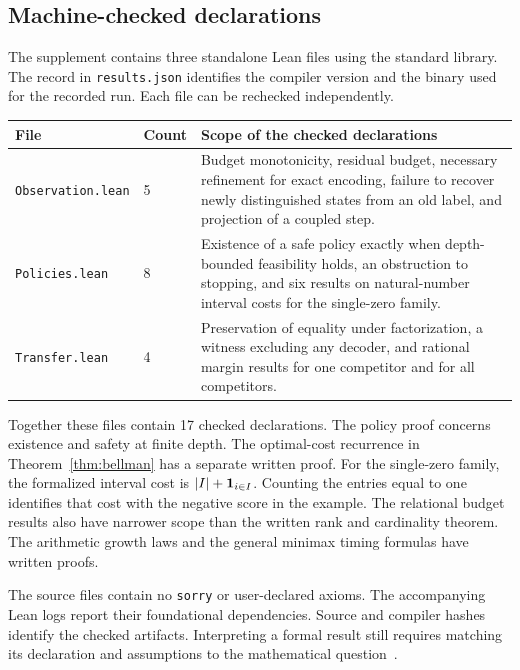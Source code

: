 \subsection{Machine-checked declarations}
The supplement contains three standalone Lean files using the standard library. The record in \texttt{results.json} identifies the compiler version and the binary used for the recorded run. Each file can be rechecked independently.
\begin{longtable}{p{}p{}p{}}
\toprule File & Count & Scope of the checked declarations\\\midrule\endhead
\texttt{Observation.lean} & 5 & Budget monotonicity, residual budget, necessary refinement for exact encoding, failure to recover newly distinguished states from an old label, and projection of a coupled step.\\
\texttt{Policies.lean} & 8 & Existence of a safe policy exactly when depth-bounded feasibility holds, an obstruction to stopping, and six results on natural-number interval costs for the single-zero family.\\
\texttt{Transfer.lean} & 4 & Preservation of equality under factorization, a witness excluding any decoder, and rational margin results for one competitor and for all competitors.\\
\bottomrule
\end{longtable}
Together these files contain 17 checked declarations. The policy proof concerns existence and safety at finite depth. The optimal-cost recurrence in Theorem~\ref{thm:bellman} has a separate written proof. For the single-zero family, the formalized interval cost is $|I|+\mathbf 1_{i\in I}$. Counting the entries equal to one identifies that cost with the negative score in the example. The relational budget results also have narrower scope than the written rank and cardinality theorem. The arithmetic growth laws and the general minimax timing formulas have written proofs.

The source files contain no \texttt{sorry} or user-declared axioms. The accompanying Lean logs report their foundational dependencies. Source and compiler hashes identify the checked artifacts. Interpreting a formal result still requires matching its declaration and assumptions to the mathematical question~\cite{lean}.


